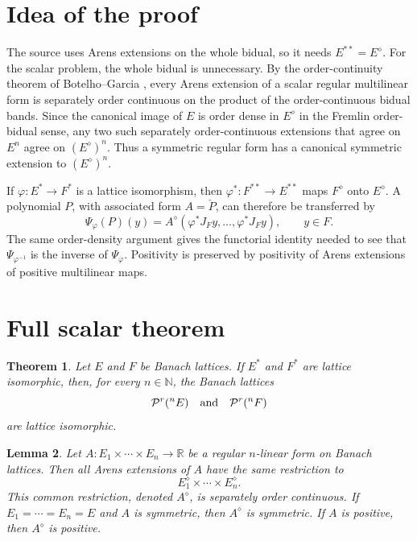 \documentclass[11pt]{amsart}
\newtheorem{theorem}{Theorem}
\newtheorem{lemma}[theorem]{Lemma}
\newcommand{\Prg}{\mathcal P^r}
\newcommand{\R}{\mathbb R}
\newcommand{\N}{\mathbb N}
\begin{document}
\section*{Idea of the proof}

The source uses Arens extensions on the whole bidual, so it needs
$E^{**}=E^\diamond$.  For the scalar problem, the whole bidual is unnecessary.
By the order-continuity theorem of Botelho--Garcia \cite{BotelhoGarcia2022},
every Arens extension of a scalar regular multilinear form is separately order
continuous on the product of the order-continuous bidual bands.  Since the
canonical image of $E$ is order dense in $E^\diamond$ in the Fremlin
order-bidual sense, any two such separately order-continuous extensions that
agree on $E^n$ agree on $(E^\diamond)^n$.  Thus a symmetric regular form has a
canonical symmetric extension to $(E^\diamond)^n$.

If $\varphi:E^*\to F^*$ is a lattice isomorphism, then
$\varphi^*:F^{**}\to E^{**}$ maps $F^\diamond$ onto $E^\diamond$.  A polynomial
$P$, with associated form $A=\check P$, can therefore be transferred by
\[
        \Psi_\varphi(P)(y)
        =A^\diamond(\varphi^*J_Fy,\ldots,\varphi^*J_Fy),\qquad y\in F .
\]
The same order-density argument gives the functorial identity needed to see
that $\Psi_{\varphi^{-1}}$ is the inverse of $\Psi_\varphi$.  Positivity is
preserved by positivity of Arens extensions of positive multilinear maps.

\section*{Full scalar theorem}

\begin{theorem}\label{thm:scalar-regular}
Let $E$ and $F$ be Banach lattices.  If $E^*$ and $F^*$ are lattice
isomorphic, then, for every $n\in\N$, the Banach lattices
\[
        \Prg({}^nE) \quad\hbox{and}\quad \Prg({}^nF)
\]
are lattice isomorphic.
\end{theorem}

\begin{lemma}\label{lem:diamond-extension}
Let $A:E_1\times\cdots\times E_n\to\R$ be a regular $n$-linear form on Banach
lattices.  Then all Arens extensions of $A$ have the same restriction to
\[
        E_1^\diamond\times\cdots\times E_n^\diamond .
\]
This common restriction, denoted $A^\diamond$, is separately order continuous.
If $E_1=\cdots=E_n=E$ and $A$ is symmetric, then $A^\diamond$ is symmetric.
If $A$ is positive, then $A^\diamond$ is positive.
\end{lemma}
\end{document}
